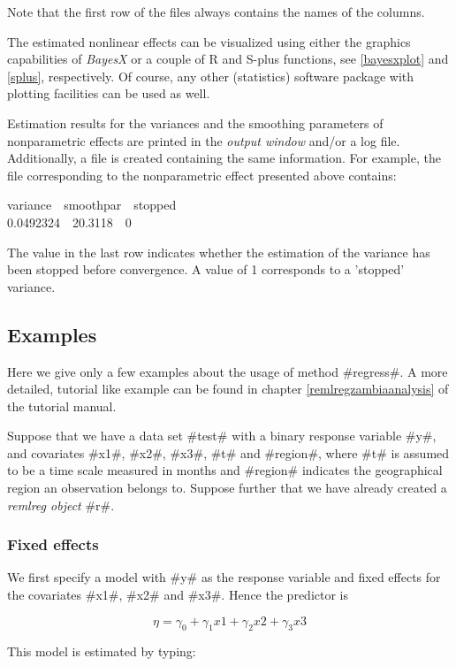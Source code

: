 Note that the first row of the files always contains the names of
the columns.

The estimated nonlinear effects can be visualized using either the
graphics capabilities of {\em BayesX} or a couple of R and S-plus
functions,  see \autoref{bayesxplot} and \autoref{splus},
respectively. Of course, any other (statistics) software package
with plotting facilities can be used as well.

Estimation results for the variances and the smoothing parameters
of nonparametric effects are printed in the {\em output window}
and/or a log file. Additionally, a file is created containing the
same information. For example, the file corresponding to the
nonparametric effect presented above contains:

\footnotesize
 variance \,\, smoothpar \,\, stopped\\
 0.0492324 \,\, 20.3118 \,\, 0
\normalsize

The value in the last row indicates whether the estimation of the
variance has been stopped before convergence. A value of 1
corresponds to a 'stopped' variance.

\subsection{Examples}

Here we give only a few examples about the usage of method
#regress#. A more detailed, tutorial like example can be found in
chapter \ref*{remlregzambiaanalysis} of the tutorial manual.

Suppose that we have a data set #test# with a binary response
variable #y#, and covariates #x1#, #x2#, #x3#, #t# and #region#,
where #t# is assumed to be a time scale measured in months and
#region# indicates the geographical region an observation belongs
to. Suppose further that we have already created a {\em remlreg
object} #r#.

\subsubsection*{Fixed effects}

We first specify a model with #y# as the response variable and
fixed effects for the covariates #x1#, #x2# and #x3#. Hence the
predictor is

$$
\eta = \gamma_0 + \gamma_1 x1 + \gamma_2 x2 + \gamma_3 x3
$$

This model is estimated by typing:

